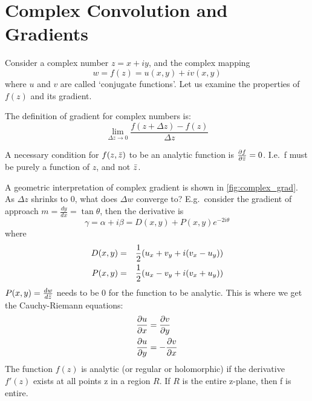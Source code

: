 \chapter{Complex Convolution and Gradients}\label{app:ch6:complex_backprop}
Consider a complex number $z=x+iy$, and the complex mapping 
\begin{equation}
w=f(z) = u(x,y) + iv(x,y)
\end{equation}
where $u$ and $v$ are called `conjugate functions'. Let us examine the
properties of $f(z)$ and its gradient. 

The definition of gradient for complex numbers is:
\begin{equation} 
  \lim_{\Delta z\to 0} \frac{f(z + \Delta z) - f(z)}{\Delta z}
\end{equation}

A necessary condition for $f(z,\bar{z})$ to be an analytic function is
$\frac{\partial f}{\partial \bar{z}}=0$. I.e.\ f must be purely a function of $z$, and not
$\bar{z}$.

A geometric interpretation of complex gradient is shown in
\autoref{fig:complex_grad}.  As $\Delta z$ shrinks to 0, what does $\Delta w$
converge to? E.g.\ consider the gradient of approach $m=\frac{dy}{dx}=\tan
\theta$, then the derivative is
\begin{equation}
  \gamma = \alpha + i\beta = D(x,y) + P(x,y)e^{-2i\theta}
\end{equation}
where
\begin{eqnarray}
  D(x,y) & = & \frac{1}{2}(u_x + v_y + i(v_x - u_y)) \\
  P(x,y) & = & \frac{1}{2}(u_x - v_y + i(v_x + u_y))
\end{eqnarray}
$P(x,y)=\frac{dw}{d\bar{z}}$ needs to be 0 for the function to be analytic.
This is where we get the Cauchy-Riemann equations:
\begin{align}
  \frac{\partial u}{\partial x}&= \frac{\partial v}{\partial y} \\
  \frac{\partial u}{\partial y}&= -\frac{\partial v}{\partial x}
\end{align}
The function $f(z)$ is analytic (or regular or holomorphic) if the derivative 
$f'(z)$ exists at all points z in a region $R$. If $R$ is the entire z-plane,
then f is entire. 

\begin{figure}[!h]
	\centering
  
  \label{fig:complex_grad}
\end{figure}

